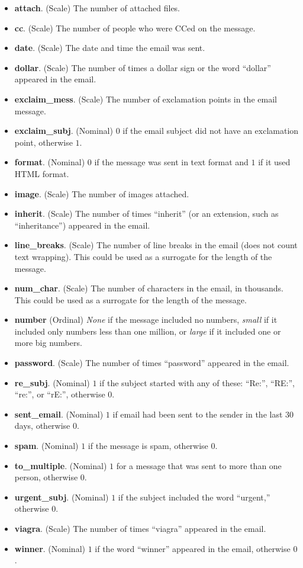 \begin{itemize}
  \item \textbf{attach}. (Scale) The number of attached files. 
  \item \textbf{cc}. (Scale) The number of people who were CCed on the message.
  \item \textbf{date}. (Scale) The date and time the email was sent.
  \item \textbf{dollar}. (Scale) The number of times a dollar sign or the word ``dollar'' appeared in the email.
  \item \textbf{exclaim\_mess}. (Scale) The number of exclamation points in the email message.
  \item \textbf{exclaim\_subj}. (Nominal) $ 0 $ if the email subject did not have an exclamation point, otherwise $ 1 $.
  \item \textbf{format}. (Nominal) $ 0 $ if the message was sent in text format and $ 1 $ if it used HTML format.
  \item \textbf{image}. (Scale) The number of images attached.
  \item \textbf{inherit}. (Scale) The number of times ``inherit'' (or an extension, such as ``inheritance'') appeared in the email.
  \item \textbf{line\_breaks}. (Scale) The number of line breaks in the email (does not count text wrapping). This could be used as a surrogate for the length of the message.
  \item \textbf{num\_char}. (Scale) The number of characters in the email, in thousands. This could be used as a surrogate for the length of the message.
  \item \textbf{number} (Ordinal) \textit{None} if the message included no numbers, \textit{small} if it included only numbers less than one million, or \textit{large} if it included one or more big numbers.
  \item \textbf{password}. (Scale) The number of times ``password'' appeared in the email.
  \item \textbf{re\_subj}. (Nominal) $ 1 $ if the subject started with any of these: ``Re:'', ``RE:'', ``re:'', or ``rE:'', otherwise $ 0 $.
  \item \textbf{sent\_email}. (Nominal) $ 1 $ if email had been sent to the sender in the last $ 30 $ days, otherwise $ 0 $.
  \item \textbf{spam}. (Nominal) $ 1 $ if the message is spam, otherwise $ 0 $.
  \item \textbf{to\_multiple}. (Nominal) $ 1 $ for a message that was sent to more than one person, otherwise $ 0 $.
  \item \textbf{urgent\_subj}. (Nominal) $ 1 $ if the subject included the word ``urgent,'' otherwise $ 0 $.
  \item \textbf{viagra}. (Scale) The number of times ``viagra'' appeared in the email.
  \item \textbf{winner}. (Nominal) $ 1 $ if the word ``winner'' appeared in the email, otherwise $ 0 $.
\end{itemize}

